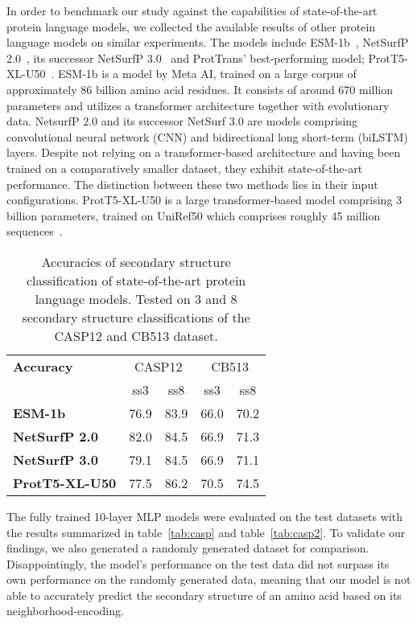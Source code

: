 In order to benchmark our study against the capabilities of state-of-the-art protein language models, we collected the available results of other protein language models on similar experiments. The models include ESM-1b~\cite{esm}, NetSurfP 2.0~\cite{netsurf}, its successor NetSurfP 3.0~\cite{netsurf3} and ProtTrans' best-performing model; ProtT5-XL-U50~\cite{prottrans}. ESM-1b is a model by Meta AI, trained on a large corpus of approximately 86 billion amino acid residues. It consists of around 670 million parameters and utilizes a transformer architecture together with evolutionary data. NetsurfP 2.0 and its successor NetSurf 3.0 are models comprising convolutional neural network (CNN) and bidirectional long short-term (biLSTM) layers. Despite not relying on a transformer-based architecture and having been trained on a comparatively smaller dataset, they exhibit state-of-the-art performance. The distinction between these two methods lies in their input configurations. ProtT5-XL-U50 is a large transformer-based model comprising 3 billion parameters, trained on UniRef50 which comprises roughly 45 million sequences~\cite{uniref}.

\begin{table}[h]
    \caption{Accuracies of secondary structure classification of state-of-the-art protein language models. Tested on 3 and 8 secondary structure classifications of the CASP12 and CB513 dataset.}
    \label{tab:casp3}
    \centering
    \begin{tabular}{lcc|cc}
        \toprule
        \textbf{Accuracy} & \multicolumn{2}{c|}{CASP12} & \multicolumn{2}{c|}{CB513}\\
        & ss3 & ss8 & ss3 & ss8\\
        \midrule
        \textbf{ESM-1b} & 76.9 & 83.9 & 66.0 & 70.2\\
        \textbf{NetSurfP 2.0} & 82.0 & 84.5 & 66.9 & 71.3\\
        \textbf{NetSurfP 3.0} & 79.1 & 84.5 & 66.9 & 71.1\\
        \textbf{ProtT5-XL-U50} & 77.5 & 86.2 & 70.5 & 74.5\\
        \bottomrule
    \end{tabular}
  \end{table}

The fully trained 10-layer MLP models were evaluated on the test datasets with the results summarized in table~\ref{tab:casp} and table~\ref{tab:casp2}. To validate our findings, we also generated a randomly generated dataset for comparison. Disappointingly, the model's performance on the test data did not surpass its own performance on the randomly generated data, meaning that our model is not able to accurately predict the secondary structure of an amino acid based on its neighborhood-encoding.

